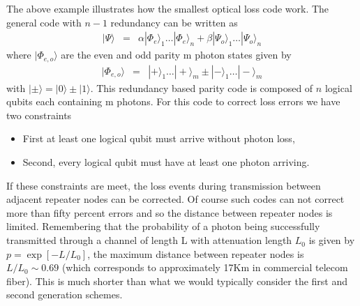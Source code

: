 \documentclass[twocolumn, aps, rmp, amsmath, amssymb, nofootinbib, superscriptaddress, longbibliography, floatfix, table-of-contents, eqsecnum]{revtex4-1}
\begin{document}
The above example illustrates how the smallest optical loss code work. The general code with $n - 1$ redundancy can be written as \cite{ralph05,munro12} 
\begin{align}
|\Psi\rangle &=& \alpha |\Phi_{e}\rangle_1 \ldots  |\Phi_{{e}}\rangle_n+\beta |\Psi_{o}\rangle_1 \ldots  |\Psi_{o}\rangle_n
\end{align}
where $|\Phi_{e,o}\rangle$ are the even and odd parity m photon states given by \begin{align}
|\Phi_{e,o}\rangle &=&  |+\rangle_1 \ldots  |+\rangle_m\pm |-\rangle_1 \ldots  |-\rangle_m
\end{align}
with   $|\pm\rangle=|0\rangle\pm |1\rangle$. This redundancy based parity code is composed of $n$ logical qubits each containing m photons. For this code to correct loss errors we have two constraints
\begin{itemize}
\item First at least one logical qubit must arrive without photon loss,
\item Second, every  logical qubit must have at least one photon arriving.
\end{itemize}
If these constraints are meet, the loss events during transmission between adjacent repeater nodes can be corrected. Of course such codes can not correct more than fifty percent errors and so the distance between repeater nodes is limited. Remembering that the probability of a photon being successfully transmitted through a channel of length L with attenuation length $L_0$ is given by $p=\exp \left[ -L/L_0\right]$, the maximum distance between repeater nodes is $L/L_0\sim 0.69$ (which corresponds to approximately 17Km in commercial telecom fiber). This is much shorter than what we would typically consider the first and second generation schemes.
\end{document}
